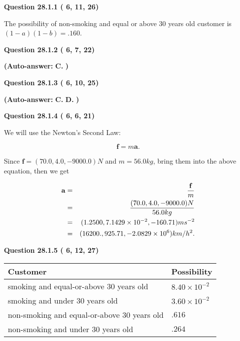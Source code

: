 \documentclass[12pt]{article}
\begin{document}
   
  
  
{\textbf{\large{Question
28.1.1 
 (          6,         11,         26)
}}}

The possibility of  %
 non-smoking and  %
equal or above 30 years old
customer is $ (1-a)(1-b) =  %
.160 $.
  
  
{\textbf{\large{Question
28.1.2 
 (          6,          7,         22)
}}}
 
 
{\textbf{(Auto-answer:}}
{\textbf{\large{
C.}}}
{\textbf{)}}
 
 
  
  
{\textbf{\large{Question
28.1.3 
 (          6,         10,         25)
}}}
 
 
{\textbf{(Auto-answer:}}
{\textbf{\large{
C.}}}
{\textbf{\large{
D.}}}
{\textbf{)}}
 
 
  
  
{\textbf{\large{Question
28.1.4 
 (          6,          6,         21)
}}}

We will use the Newton's Second Law:
 
\[
\mathbf{f}=m\mathbf{a}.
\]
 
Since $\mathbf{f}=( %
70.0,  %
4.0,  %
-9000.0 )N$
and $m= %
56.0 kg$, bring them into the above equation, then we get
 
\begin{eqnarray*}
\mathbf{a}&=&\frac{\mathbf{f}}m  \\
&=&\frac{(
70.0 ,
4.0 ,
-9000.0 )N
}{ %
56.0 kg}  \\
&=&(
1.2500 ,
7.1429 \times 10^{-2},
-160.71
)ms^{-2} \\
&=&(
16200. ,
925.71 ,
-2.0829 \times 10^{6}
)km/h^2.
\end{eqnarray*}
 
  
  
{\textbf{\large{Question
28.1.5 
 (          6,         12,         27)
}}}

 
\noindent
\begin{tabular}{|l|l|}
\hline
Customer & Possibility \\
\hline
smoking  and  %
equal-or-above 30 years old &
  $ %
8.40 \times 10^{-2}$ \\
\hline
smoking  and  %
under 30 years old &
  $ %
3.60 \times 10^{-2}$ \\
\hline
 non-smoking and  %
equal-or-above 30 years old &
  $ %
.616$ \\
\hline
 non-smoking and  %
under 30 years old &
  $ %
.264$ \\
\hline
\end{tabular}
 
\end{document}
